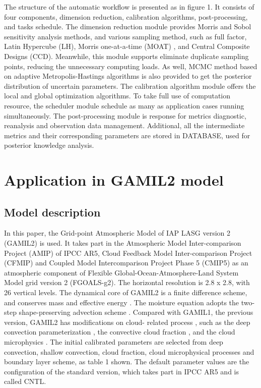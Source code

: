 \documentclass[gmd, manuscript]{copernicus}
\begin{document}
The structure of the automatic workflow is presented as in figure 1. It consists of four components, dimension reduction, calibration algorithms, post-processing, and tasks schedule. The dimension reduction module provides Morris and Sobol sensitivity analysis methods, and various sampling method, such as full factor, Latin Hypercube (LH), Morris one-at-a-time (MOAT) , and Central Composite Designs (CCD). Meanwhile, this module supports eliminate duplicate sampling points, reducing the unnecessary computing loads. As well, MCMC method based on adaptive Metropolis-Hastings algorithms is also provided to get the posterior distribution of uncertain parameters. The calibration algorithm module offers the local and global optimization algorithms. To take full use of computation resource, the scheduler module schedule as many as application cases running simultaneously. The post-processing module is response for metrics diagnostic, reanalysis and observation data management. Additional, all the intermediate metrics and their corresponding parameters are stored in DATABASE, used for posterior knowledge analysis.


\section{Application in GAMIL2 model} 
\subsection{Model description} 
In this paper, the Grid-point Atmospheric Model of IAP LASG version 2 (GAMIL2) is used. It takes
part in the Atmospheric Model Inter-comparison Project (AMIP) of IPCC AR5, Cloud Feedback Model
Inter-comparison Project (CFMIP) and  Coupled Model Intercomparison Project Phase 5 (CMIP5) as an
atmospheric component of Flexible Global-Ocean-Atmosphere-Land System Model grid version 2
(FGOALS-g2). The horizontal resolution is 2.8 x 2.8, with 26 vertical levels. The dynamical core of
GAMIL2 is a finite difference scheme, and conserves mass and effective energy
\citep{wang2004design}. The moisture equation adopts the two- step shape-preserving advection
scheme \citep{rucong1994two}. Compared with GAMIL1, the previous version, GAMIL2 has modifications on cloud-
related process \citep{li2013evaluation}, such as the deep convection parameterization
\citep{zhang2005effects}, the convective cloud fraction \citep{xu1991evaluation}, and the cloud
microphysics \citep{morrison2008new}. The initial calibrated parameters are selected  from deep
convection, shallow convection, cloud fraction, cloud microphysical processes and boundary layer
scheme, as table 1 shown. The default parameter values are the configuration of the standard
version, which takes part in IPCC AR5 and is called CNTL.
\end{document}
